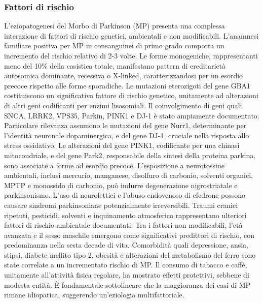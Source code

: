 \subsubsection{Fattori di rischio}
L'eziopatogenesi del Morbo di Parkinson (MP) presenta una complessa interazione di fattori di rischio genetici, ambientali e non modificabili. L'anamnesi familiare positiva per MP in consanguinei di primo grado comporta un incremento del rischio relativo di 2-3 volte. Le forme monogeniche, rappresentanti meno del 10\% della casistica totale, manifestano pattern di ereditarietà autosomica dominante, recessiva o X-linked, caratterizzandosi per un esordio precoce rispetto alle forme sporadiche.
Le mutazioni eterozigoti del gene GBA1 costituiscono un significativo fattore di rischio genetico, unitamente ad alterazioni di altri geni codificanti per enzimi lisosomiali. Il coinvolgimento di geni quali SNCA, LRRK2, VPS35, Parkin, PINK1 e DJ-1 è stato ampiamente documentato. Particolare rilevanza assumono le mutazioni del gene Nurr1, determinante per l'identità neuronale dopaminergica, e del gene DJ-1, cruciale nella risposta allo stress ossidativo. Le alterazioni del gene PINK1, codificante per una chinasi mitocondriale, e del gene Park2, responsabile della sintesi della proteina parkina, sono associate a forme ad esordio precoce.
L'esposizione a neurotossine ambientali, inclusi mercurio, manganese, disolfuro di carbonio, solventi organici, MPTP e monossido di carbonio, può indurre degenerazione nigrostriatale e parkinsonismo. L'uso di neurolettici e l'abuso endovenoso di efedrone possono causare sindromi parkinsoniane potenzialmente irreversibili. Traumi cranici ripetuti, pesticidi, solventi e inquinamento atmosferico rappresentano ulteriori fattori di rischio ambientale documentati.
Tra i fattori non modificabili, l'età avanzata e il sesso maschile emergono come significativi predittori di rischio, con predominanza nella sesta decade di vita. Comorbidità quali depressione, ansia, stipsi, diabete mellito tipo 2, obesità e alterazioni del metabolismo del ferro sono state correlate a un incrementato rischio di MP.
Il consumo di tabacco e caffè, unitamente all'attività fisica regolare, ha mostrato effetti protettivi, sebbene di modesta entità. È fondamentale sottolineare che la maggioranza dei casi di MP rimane idiopatica, suggerendo un'eziologia multifattoriale.

